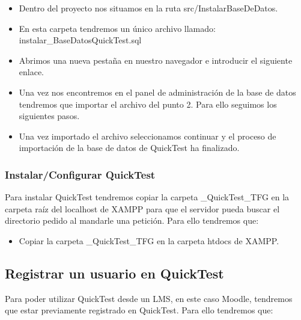 \begin{itemize}

	\item Dentro del proyecto nos situamos en la ruta src/InstalarBaseDeDatos.
	
	\item En esta carpeta tendremos un único archivo llamado: instalar\_BaseDatosQuickTest.sql
	
	\item Abrimos una nueva pestaña en nuestro navegador e introducir el siguiente enlace. 
	
	\item Una vez nos encontremos en el panel de administración de la base de datos tendremos que importar el archivo del punto 2. Para ello seguimos los siguientes pasos. 
	
	\item Una vez importado el archivo seleccionamos continuar y el proceso de importación de la base de datos de QuickTest ha finalizado.

\end{itemize}

\subsubsection{Instalar/Configurar QuickTest}

Para instalar QuickTest tendremos copiar la carpeta \_QuickTest\_TFG en la carpeta raíz del localhost de XAMPP para que el servidor pueda buscar el directorio pedido al mandarle una petición.
Para ello tendremos que:

\begin{itemize}

	\item Copiar la carpeta \_QuickTest\_TFG en la carpeta htdocs de XAMPP. 

\end{itemize}

\subsection{Registrar un usuario en QuickTest}

Para poder utilizar QuickTest desde un LMS, en este caso Moodle, tendremos que estar previamente registrado en QuickTest. Para ello tendremos que:

